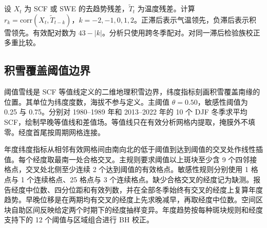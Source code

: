 设 $X_t$ 为 SCF 或 SWE 的去趋势残差，$\widetilde T_t$ 为温度残差。计算 $r_k=\mathrm{corr}(X_t,\widetilde T_{t-k})$，$k=-2,-1,0,1,2$。正滞后表示气温领先，负滞后表示积雪领先。有效配对数为 $43-|k|$。分析只使用跨冬季配对。对同一滞后检验族校正多重比较。

\subsection{积雪覆盖阈值边界}

阈值雪线是 SCF 等值线定义的二维地理积雪边界，纬度指标刻画积雪覆盖南缘的位置。其单位为纬度度数，海拔不参与定义。主阈值 $\theta=0.50$，敏感性阈值为 0.25 与 0.75。分别对 1980--1989 年和 2013--2022 年的 10 个 DJF 冬季求平均 SCF，绘制早晚等值线和差值场。等值线只在有效分析网格内提取，掩膜外不填零。经度首尾按周期网格连接。

年度纬度指标从相邻有效网格间由南向北的低于阈值到达到阈值的交叉处作线性插值。每个经度取最南一处合格交叉。主规则要求阈值以上斑块至少含 9 个四邻接格点，交叉处北侧至少连续 2 个达到阈值的有效格点。敏感性规则分别使用 1 格点与 1 个连续格点、25 格点与 3 个连续格点。缺少合格交叉的经度记为缺测。报告经度中位数、四分位距和有效列数，并在全部冬季始终有交叉的经度上复算年度趋势。早晚位移是在两期均有交叉的经度上先求晚减早，再取经度中位数。空间区块自助区间反映给定两个时期下的经度抽样变异。年度趋势按每种斑块规则和经度支持下的 12 个阈值与区域组合进行 BH 校正。
